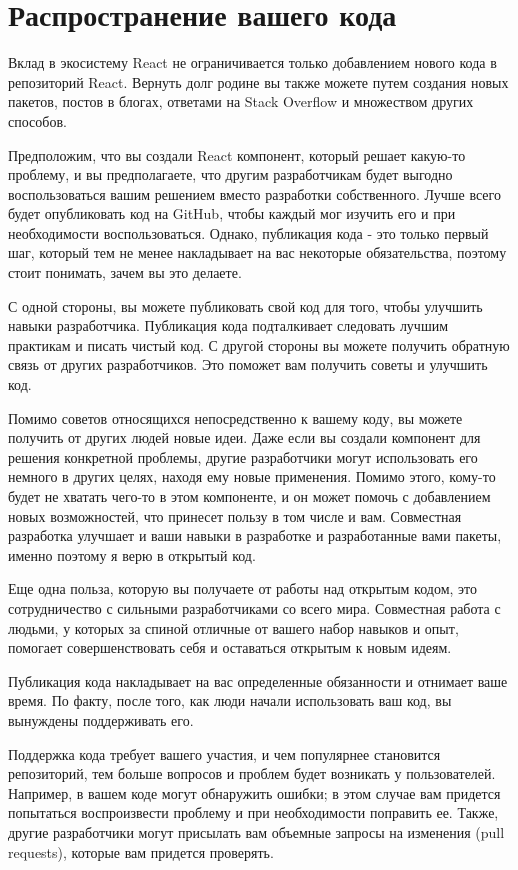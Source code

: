 \section{Распространение вашего кода}

Вклад в экосистему React не ограничивается только добавлением нового кода в репозиторий React. Вернуть долг родине вы также можете путем создания новых пакетов, постов в блогах, ответами на Stack Overflow и множеством других способов.

Предположим, что вы создали React компонент, который решает какую-то проблему, и вы предполагаете, что другим разработчикам будет выгодно воспользоваться вашим решением вместо разработки собственного. Лучше всего будет опубликовать код на GitHub, чтобы каждый мог изучить его и при необходимости воспользоваться. Однако, публикация кода - это только первый шаг, который тем не менее накладывает на вас некоторые обязательства, поэтому стоит понимать, зачем вы это делаете. 

С одной стороны, вы можете публиковать свой код для того, чтобы улучшить навыки разработчика. Публикация кода подталкивает следовать лучшим практикам и писать чистый код. С другой стороны вы можете получить обратную связь от других разработчиков. Это поможет вам получить советы и улучшить код.

Помимо советов относящихся непосредственно к вашему коду, вы можете получить от других людей новые идеи. Даже если вы создали компонент для решения конкретной проблемы, другие разработчики могут использовать его немного в других целях, находя ему новые применения. Помимо этого, кому-то будет не хватать чего-то в этом компоненте, и он может помочь с добавлением новых возможностей, что принесет пользу в том числе и вам. Совместная разработка улучшает и ваши навыки в разработке и разработанные вами пакеты, именно поэтому я верю в открытый код.

Еще одна польза, которую вы получаете от работы над открытым кодом, это сотрудничество с сильными разработчиками со всего мира. Совместная работа с людьми, у которых за спиной отличные от вашего набор навыков и опыт, помогает совершенствовать себя и оставаться открытым к новым идеям.

Публикация кода накладывает на вас определенные обязанности и отнимает ваше время. По факту, после того, как люди начали использовать ваш код, вы вынуждены поддерживать его. 

Поддержка кода требует вашего участия, и чем популярнее становится репозиторий, тем больше вопросов и проблем будет возникать у пользователей. Например, в вашем коде могут обнаружить ошибки; в этом случае вам придется попытаться воспроизвести проблему и при необходимости поправить ее. Также, другие разработчики могут присылать вам объемные запросы на изменения (pull requests), которые вам придется проверять. 

